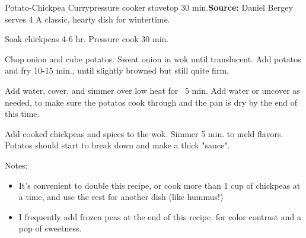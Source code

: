 \begin{recipe}{Potato-Chickpea Curry}{pressure cooker \hfill stovetop \hfill 30 min.}{\textbf{Source:} Daniel Bergey \hfill serves 4}
  \freeform A classic, hearty dish for wintertime.

Soak chickpeas 4-6 hr. Pressure cook 30 min.

Chop onion and cube potatos. Sweat onion in wok until translucent. Add potatos and fry 10-15 min., until slightly browned but still quite firm.

Add water, cover, and simmer over low heat for ~5 min. Add water or uncover as needed, to make sure the potatos cook through and the pan is dry by the end of this time.

Add cooked chickpeas and spices to the wok. Simmer 5 min. to meld flavors. Potatos should start to break down and make a thick "sauce".

\freeform Notes:
\begin{itemize}
  \item It's convenient to double this recipe, or cook more than 1 cup of chickpeas at a time, and use the rest for another dish (like hummus!)
  \item I frequently add frozen peas at the end of this recipe, for color contrast and a pop of sweetness.
\end{itemize}
\end{recipe}